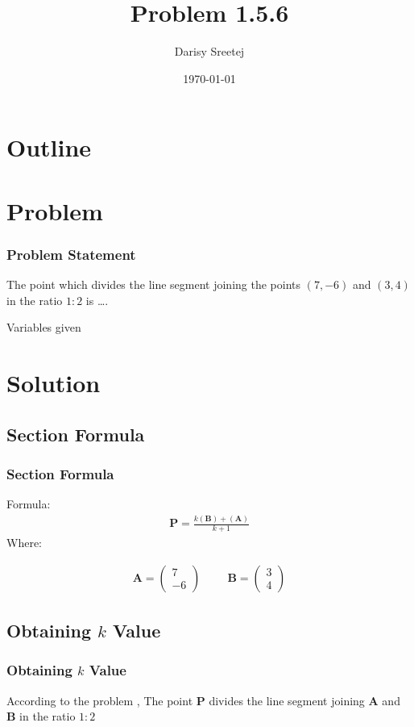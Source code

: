 \documentclass{beamer}
\title{Problem 1.5.6}
\author{Darisy Sreetej}
\date{\today}
\providecommand{\brak}[1]{\ensuremath{\left(#1\right)}}
\theoremstyle{remark}
\newcommand{\myvec}[1]{\ensuremath{\begin{pmatrix}#1\end{pmatrix}}}
\let\vec\mathbf
\numberwithin{equation}{section}
\begin{document}
\begin{frame}
\titlepage
\end{frame}

\section*{Outline}
\begin{frame}
\tableofcontents
\end{frame}
\section{Problem}
\begin{frame}
\frametitle{Problem Statement}
%
 The point which divides the line segment joining the points $\brak{7,-6}$ and $\brak{3, 4}$ in the ratio $1 : 2$ is \dots.
 \begin{table}[h!]    
  \centering
  
  \caption{Variables given}
  \label{tab 1.4.9.2}
\end{table}
\end{frame}

\section{Solution}
\subsection{Section Formula}
\begin{frame}
\frametitle{Section Formula}
Formula:
\begin{align}
\vec{P}=\frac{k(\vec{B})+(\vec{A})}{k+1}
\end{align}
Where: 


\begin{align}
\vec{A}=\myvec{7\\-6} \hspace{1cm} \vec{B}=\myvec{3\\4} 
\end{align}

\end{frame}
\subsection{Obtaining $k$ Value}
\begin{frame}
\frametitle{Obtaining $k$ Value}
According to the problem , 
The point $\vec{P}$ divides the line segment joining $\vec{A}$ and $\vec{B}$ in the ratio $1:2$

\end{frame}
\end{document}
